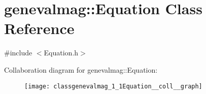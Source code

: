 \hypertarget{classgenevalmag_1_1Equation}{
\section{genevalmag::Equation Class Reference}
\label{classgenevalmag_1_1Equation}
}


{\ttfamily \#include $<$Equation.h$>$}



Collaboration diagram for genevalmag::Equation:\nopagebreak
\begin{figure}[H]
\begin{center}
\leavevmode
\texttt{[image: classgenevalmag\_1\_1Equation\_\_coll\_\_graph]}
\end{center}
\end{figure}
